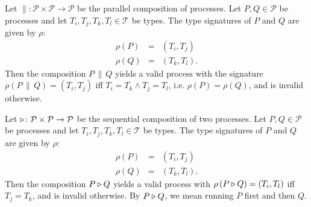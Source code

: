\begin{definition}
Let $\parallel \colon \mathcal{P} \times \mathcal{P} \to \mathcal{P}$ be the parallel composition of processes. Let $P, Q \in \mathcal{P}$ be processes and let $T_i, T_j, T_k, T_l \in \mathcal{T}$ be types. The type signatures of $P$ and $Q$ are given by $\rho$:
\begin{eqnarray*}
  \rho \left( P \right) & = & \left( T_i, T_j \right) \\
  \rho \left( Q \right) & = & \left( T_k, T_l \right).
\end{eqnarray*}
Then the composition $P \,\parallel\, Q$ yields a valid process with the signature $\rho \left( P \,\parallel\, Q \right) = \left( T_i, T_j \right)$ iff $T_i = T_k \wedge T_j = T_l$, i.e. $\rho \left( P \right) = \rho \left( Q \right)$, and is invalid otherwise.

\hfill\qedsymbol
\end{definition}


\begin{definition}
\label{def:static_sequence}
Let $\triangleright \colon \mathcal{P} \times \mathcal{P} \to \mathcal{P}$ be the sequential composition of two processes. Let $P, Q \in \mathcal{P}$ be processes and let $T_i, T_j, T_k, T_l \in \mathcal{T}$ be types. The type signatures of $P$ and $Q$ are given by $\rho$: 
\begin{eqnarray*}
  \rho \left( P \right) & = & \left( T_i, T_j \right) \\
  \rho \left( Q \right) & = & \left( T_k, T_l \right).
\end{eqnarray*}
Then the composition $P \triangleright Q$ yields a valid process with $\rho \left( P \triangleright Q \right) = \left( T_i, T_l \right)$ iff $T_j = T_k$, and is invalid otherwise. By $P \triangleright Q$, we mean running $P$ first and then $Q$.

\hfill\qedsymbol
\end{definition}


